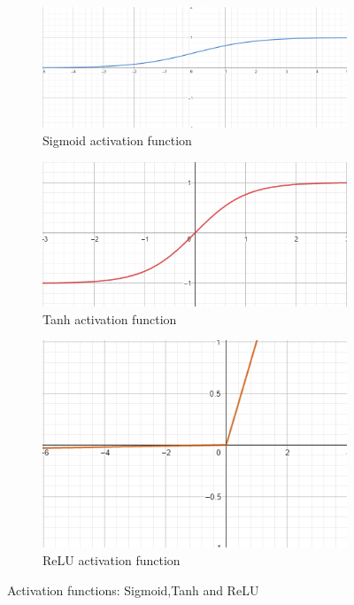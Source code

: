 \begin{figure}[h!]
    \begin{subfigure}[b]{0.5\textwidth}
        \centering
        \includegraphics[width=\textwidth]{figures/sigmoid}
        \caption{Sigmoid activation function}
        \label{fig:sigmoid}
    \end{subfigure}
    \hfill
    \begin{subfigure}[b]{0.45\textwidth}
        \centering
        \includegraphics[width=\textwidth]{figures/tanh}
        \caption{Tanh activation function}
        \label{fig:tanh}
    \end{subfigure}
    \hfill
    \begin{subfigure}[b]{0.45\textwidth}
        \centering
        \includegraphics[width=\textwidth]{figures/relu}
        \caption{ReLU activation function}
        \label{fig:relu}
    \end{subfigure}

    \caption{Activation functions: Sigmoid,Tanh and ReLU}
    \label{fig:activation_functions}
\end{figure}


